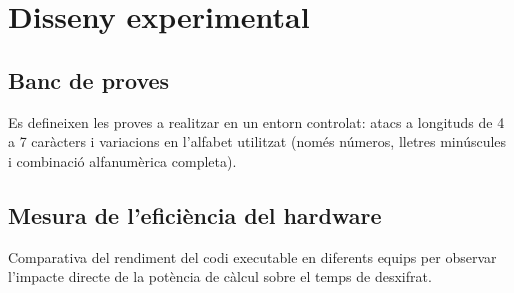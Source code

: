 \chapter{Disseny experimental}

\section{Banc de proves}
Es defineixen les proves a realitzar en un entorn controlat: atacs a longituds de 4 a 7 caràcters i variacions en l'alfabet utilitzat (només números, lletres minúscules i combinació alfanumèrica completa).

\section{Mesura de l'eficiència del hardware}
Comparativa del rendiment del codi executable en diferents equips per observar l'impacte directe de la potència de càlcul sobre el temps de desxifrat.
